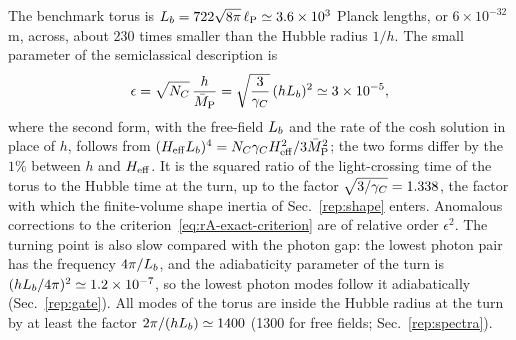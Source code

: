 The benchmark torus is $L_b=722\sqrt{8\pi}\,\ell_{\rm P}\simeq3.6\times10^3$ Planck lengths, or $6\times10^{-32}$\,m, across, about $230$ times smaller than the Hubble radius $1/h$. %
The small parameter of the semiclassical description is
\begin{equation}
\epsilon=\sqrt{N_C}\,\frac{h}{\bar M_{\mathrm{P}}}=\sqrt{\frac{3}{\gamma_C}}\,(hL_b)^2\simeq3\times10^{-5},
\label{eq:rA-epsilon}
\end{equation} %
where the second form, with the free-field $L_b$ and the rate of the cosh solution in place of $h$, follows from $(H_{\mathrm{eff}}L_b)^4=N_C\gamma_CH_{\mathrm{eff}}^2/3\bar M_{\mathrm{P}}^2$; the two forms differ by the $1\%$ between $h$ and $H_{\mathrm{eff}}$.
It is the squared ratio of the light-crossing time of the torus to the Hubble time at the turn, up to the factor $\sqrt{3/\gamma_C}=1.338$, the factor with which the finite-volume shape inertia of Sec.~\ref{rep:shape} enters.
Anomalous corrections to the criterion~\eqref{eq:rA-exact-criterion} are of relative order $\epsilon^2$.
The turning point is also slow compared with the photon gap: the lowest photon pair has the frequency $4\pi/L_b$, and the adiabaticity parameter of the turn is $(hL_b/4\pi)^2\simeq1.2\times10^{-7}$, so the lowest photon modes follow it adiabatically (Sec.~\ref{rep:gate}). %
All modes of the torus are inside the Hubble radius at the turn by at least the factor $2\pi/(hL_b)\simeq1400$ (1300 for free fields; Sec.~\ref{rep:spectra}). %
